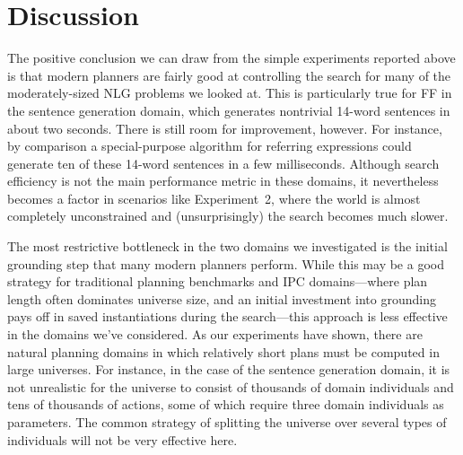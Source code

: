 \section{Discussion} \label{sec:discussion}

The positive conclusion we can draw from the simple experiments reported
above is that modern planners are fairly good at controlling the search for
many of the moderately-sized NLG problems we looked at. This is
particularly true for FF in the sentence generation domain, which generates
nontrivial 14-word sentences in about two seconds. There is still room for
improvement, however. For instance, by comparison a special-purpose
algorithm for referring expressions could generate ten of these 14-word
sentences in a few milliseconds. Although search efficiency is not the main
performance metric in these domains, it nevertheless becomes a factor in
scenarios like Experiment~2, where the world is almost completely
unconstrained and (unsurprisingly) the search becomes much slower.


The most restrictive bottleneck in the two domains we investigated is the
initial grounding step that many modern planners perform. While this may be
a good strategy for traditional planning benchmarks and IPC domains---where
plan length often dominates universe size, and an initial investment into
grounding pays off in saved instantiations during the search---this
approach is less effective in the domains we've considered. As our
experiments have shown, there are natural planning domains in which
relatively short plans must be computed in large universes. For instance,
in the case of the sentence generation domain, it is not unrealistic for
the universe to consist of thousands of domain individuals and tens of
thousands of actions, some of which require three domain individuals as
parameters. The common strategy of splitting the universe over several
types of individuals will not be very effective here.

